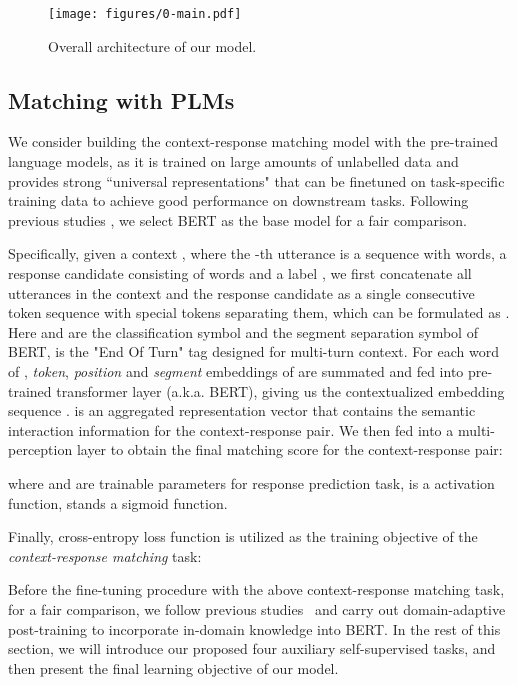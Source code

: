 \documentclass{article}
\begin{document}
\begin{figure}[t!]
\centering
  \texttt{[image: figures/0-main.pdf]}
  \vspace{-3mm}
  \caption{Overall architecture of our model.}
  \vspace{-3mm}
  \label{fig:main-architecture}
\end{figure}

\subsection{Matching with PLMs}
We consider building the context-response matching model with the pre-trained language models, as it is trained on large amounts of unlabelled data and provides strong “universal representations" that can be finetuned on task-specific training data to achieve good performance on downstream tasks.
Following previous studies \cite{gu2020speaker,whang2020domain}, we select BERT as the base model for a fair comparison.

Specifically, given a context , where the -th utterance   is a sequence with  words, a response candidate  consisting of  words and a label ,
we first concatenate all utterances in the context and the response candidate as a single consecutive token sequence with special tokens separating them, which can be formulated as
 .
Here  and  are the classification symbol and the segment separation symbol of BERT,  is the "End Of Turn" tag designed for multi-turn context.
For each word of , \emph{token}, \emph{position} and \emph{segment} embeddings of  are summated and fed into pre-trained transformer layer (a.k.a. BERT), giving us the contextualized embedding sequence . 
 is an aggregated representation vector that contains the semantic interaction information for the context-response pair.
We then fed  into a multi-perception layer to obtain the final matching score for the context-response pair:

where  and  are trainable parameters for response prediction task,  is a  activation function,  stands a sigmoid function.

Finally, cross-entropy loss function is utilized as the training objective of the \emph{context-response matching} task:


Before the fine-tuning procedure with the above context-response matching task,
for a fair comparison, we follow previous studies~\cite{whang2020domain,gu2020speaker,gururangan-etal-2020-dont} and carry out domain-adaptive post-training to incorporate in-domain knowledge into BERT.
In the rest of this section, we will introduce our proposed four auxiliary self-supervised tasks, and then present the final learning objective of our model.
\end{document}
